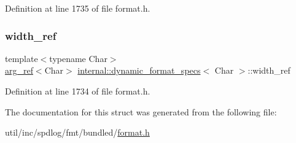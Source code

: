 Definition at line 1735 of file format.\+h.

\mbox{\label{structinternal_1_1dynamic__format__specs_a5c7f025d6bfdf67ba9a418299e75b79d}} 
\subsubsection{\texorpdfstring{width\+\_\+ref}{width\_ref}}
{\footnotesize\ttfamily template$<$typename Char$>$ \\
\hyperlink{structinternal_1_1arg__ref}{arg\+\_\+ref}$<$Char$>$ \hyperlink{structinternal_1_1dynamic__format__specs}{internal\+::dynamic\+\_\+format\+\_\+specs}$<$ Char $>$\+::width\+\_\+ref}



Definition at line 1734 of file format.\+h.



The documentation for this struct was generated from the following file\+:\begin{DoxyCompactItemize}
\item 
util/inc/spdlog/fmt/bundled/\hyperlink{format_8h}{format.\+h}\end{DoxyCompactItemize}
